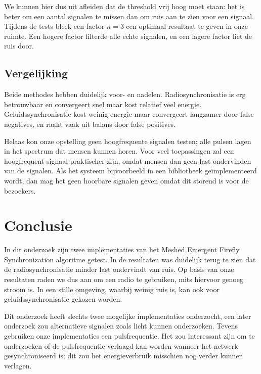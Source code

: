 \documentclass[a4paper,10pt]{article}
\begin{document}
We kunnen hier dus uit afleiden dat de threshold vrij hoog moet staan: het is beter om een aantal signalen te missen dan om ruis aan te zien voor een signaal. Tijdens de tests bleek een factor $n=3$ een optimaal resultaat te geven in onze ruimte. Een hogere factor filterde alle echte signalen, en een lagere factor liet de ruis door.

\subsection{Vergelijking}
Beide methodes hebben duidelijk voor- en nadelen. Radiosynchronisatie is erg betrouwbaar en convergeert snel maar kost relatief veel energie. Geluidssynchronisatie kost weinig energie maar convergeert langzamer door false negatives, en raakt vaak uit balans door false positives.

Helaas kon onze opstelling geen hoogfrequente signalen testen; alle pulsen lagen in het spectrum dat mensen kunnen horen. Voor veel toepassingen zal een hoogfrequent signaal praktischer zijn, omdat mensen dan geen last ondervinden van de signalen. Als het systeem bijvoorbeeld in een bibliotheek ge\"implementeerd wordt, dan mag het geen hoorbare signalen geven omdat dit storend is voor de bezoekers.

\section{Conclusie}\label{sec:conclusie}
In dit onderzoek zijn twee implementaties van het Meshed Emergent Firefly Synchronization algoritme getest. In de resultaten was duidelijk terug te zien dat de radiosynchronisatie minder last ondervindt van ruis. Op basis van onze resultaten raden we dus aan om een radio te gebruiken, mits hiervoor genoeg stroom is. In een stille omgeving, waarbij weinig ruis is, kan ook voor geluidssynchronisatie gekozen worden.

Dit onderzoek heeft slechts twee mogelijke implementaties onderzocht, een later onderzoek zou alternatieve signalen zoals licht kunnen onderzoeken. Tevens gebruiken onze implementaties een pulsfrequentie. Het zou interessant zijn om te onderzoeken of de pulsfrequentie verlaagd kan worden wanneer het netwerk gesynchroniseerd is; dit zou het energieverbruik misschien nog verder kunnen verlagen.

% 



\end{document}
